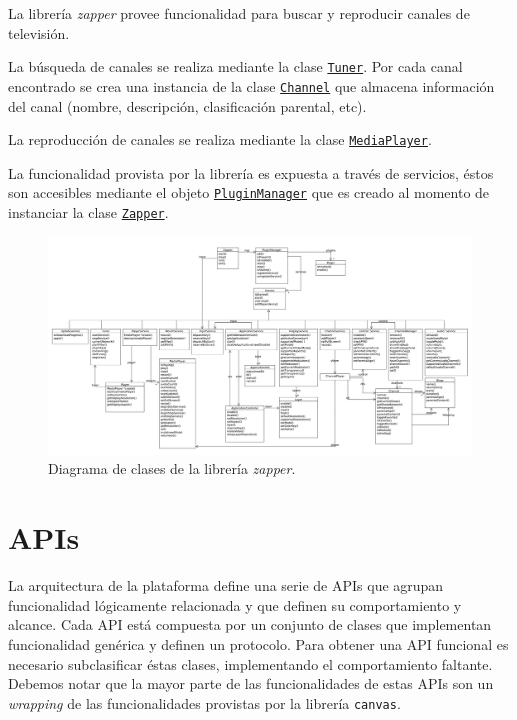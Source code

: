 La librería \emph{zapper} provee funcionalidad para buscar y reproducir canales de televisión.

La búsqueda de canales se realiza mediante la clase \hyperlink{classzapper_1_1Tuner}{\texttt{Tuner}}. Por cada canal encontrado se crea una instancia de la clase \hyperlink{classzapper_1_1channel_1_1Channel}{\texttt{Channel}} que almacena información del canal (nombre, descripción, clasificación parental, etc).

La reproducción de canales se realiza mediante la clase \hyperlink{classzapper_1_1MediaPlayer}{\texttt{MediaPlayer}}.

La funcionalidad provista por la librería es expuesta a través de servicios, éstos son accesibles mediante el objeto \hyperlink{classzapper_1_1PluginManager}{\texttt{PluginManager}} que es creado al momento de instanciar la clase \hyperlink{classzapper_1_1Zapper}{\texttt{Zapper}}.

\begin{figure}[h!]
	\centering
	\includegraphics[scale=0.26]{resources/uml-dtv-zapper.jpg}
	\caption{Diagrama de clases de la librería \emph{zapper}.}
\end{figure}
\FloatBarrier

\section{APIs}
La arquitectura de la plataforma define una serie de APIs que agrupan funcionalidad lógicamente relacionada y que definen su comportamiento y alcance. Cada API está compuesta por un conjunto de clases que implementan funcionalidad genérica y definen un protocolo. Para obtener una API funcional es necesario subclasificar éstas clases, implementando el comportamiento faltante. Debemos notar que la mayor parte de las funcionalidades de estas APIs son un 
\textit{wrapping} 
de las funcionalidades provistas por la librería \texttt{canvas}.

